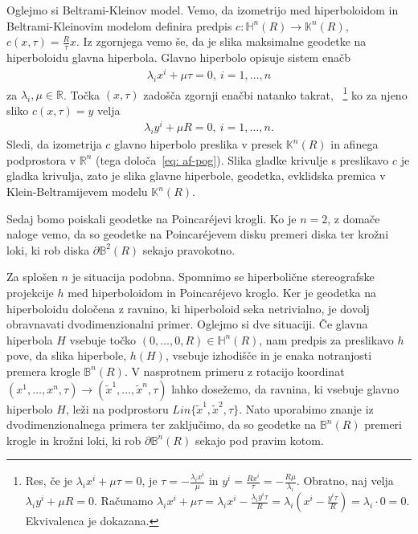 \documentclass[a4paper]{article}
\begin{document}
Oglejmo si Beltrami-Kleinov model. Vemo, da izometrijo med hiperboloidom in Beltrami-Kleinovim modelom definira predpis $c \colon \mathbb{H}^{n}(R) \to \mathbb{K}^{n}(R)$, $c(x,\tau) = \frac{R}{\tau}x$. Iz zgornjega vemo še, da je slika maksimalne geodetke na hiperboloidu glavna hiperbola.
Glavno hiperbolo opisuje sistem enačb 
\begin{gather}
\lambda_{i}x^{i} + \mu \tau = 0, \ i=1, \dots , n
\end{gather}
za $\lambda_{i}, \mu \in \mathbb{R}$.
Točka $(x,\tau)$ zadošča zgornji enačbi natanko takrat,
~\footnote{Res, če je $\lambda_{i}x^{i}+\mu \tau=0$, je $\tau=-\frac{\lambda_{i}x^{i}}{\mu}$ in $y^{i}=\frac{Rx^{i}}{\tau}=-\frac{R\mu}{\lambda_{i}}$. 
Obratno, naj velja $\lambda_{i}y^{i} + \mu R = 0$. Računamo $\lambda_{i}x^{i}+\mu \tau = \lambda_{i}x^{i} - \frac{\lambda_{i}y^{i}\tau}{R} = \lambda_{i} (x^{i} - \frac{y^{i}\tau}{R}) = \lambda_{i} \cdot 0 = 0$. Ekvivalenca je dokazana.} 
ko za njeno sliko $c(x,\tau)=y$ velja 
\begin{gather}\label{eq: af-pog}
\lambda_{i}y^{i} + \mu R = 0, \ i=1, \dots , n.
\end{gather}
Sledi, da izometrija $c$ glavno hiperbolo preslika v presek $\mathbb{K}^{n}(R)$ in afinega podprostora v $\mathbb{R}^{n}$ (tega določa~\ref{eq: af-pog}). Slika gladke krivulje s preslikavo $c$ je gladka krivulja, zato je slika glavne hiperbole, geodetka, evklidska premica v Klein-Beltramijevem modelu $\mathbb{K}^{n}(R)$.\newline

Sedaj bomo poiskali geodetke na Poincar\'ejevi krogli.
Ko je $n=2$, z domače naloge vemo, da so geodetke na Poincar\'ejevem disku premeri diska ter krožni loki, ki rob diska $\partial \mathbb{B}^{2}(R)$ sekajo pravokotno.

Za splošen $n$ je situacija podobna. Spomnimo se hiperbolične stereografske projekcije $h$ med hiperboloidom in Poincar\'ejevo kroglo. Ker je geodetka na hiperboloidu določena z ravnino, ki hiperboloid seka netrivialno, je dovolj obravnavati dvodimenzionalni primer. Oglejmo si dve situaciji. Če glavna hiperbola $H$ vsebuje točko $(0, \dots , 0,R) \in \mathbb{H}^{n}(R)$, nam predpis za preslikavo $h$ pove, da slika hiperbole, $h(H)$, vsebuje izhodišče in je enaka notranjosti premera krogle $\mathbb{B}^{n}(R)$. V nasprotnem primeru z rotacijo koordinat $(x^{1}, \dots , x^{n}, \tau) \to (\tilde{x}^{1}, \dots , \tilde{x}^{n}, \tau)$ lahko dosežemo, da ravnina, ki vsebuje glavno hiperbolo $H$, leži na podprostoru $\mathit{Lin} \{ \tilde{x}^{1}, \tilde{x}^{2}, \tau \}$. Nato uporabimo znanje iz dvodimenzionalnega primera ter zaključimo, da so geodetke na $\mathbb{B}^{n}(R)$ premeri krogle in krožni loki, ki rob $\partial \mathbb{B}^{n}(R)$ sekajo pod pravim kotom.\newline
\end{document}
